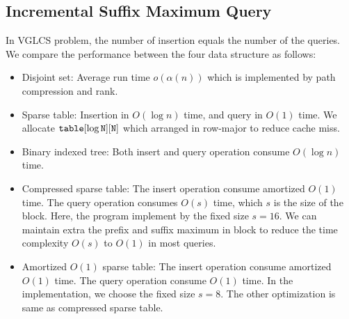 

\subsection{Incremental Suffix Maximum Query}

In VGLCS problem, the number of insertion equals the number of the
queries. We compare the performance between the four data structure as
follows:

\iffalse
針對插入和詢問次數相同的 ISMQ 問題，運行以下四種數據結構：
\fi

\begin{itemize}
  \item 

Disjoint set: Average run time $o(\alpha(n))$ which is implemented by
path compression and rank.

  \item 

Sparse table: Insertion in $O(\log n)$ time, and query in $O(1)$ time.
We allocate $\tt{table}[\log N][N]$ which arranged in row-major to
reduce cache miss.

  \item 

Binary indexed tree: Both insert and query operation consume $O(\log
n)$ time.

  \item 

Compressed sparse table: The insert operation consume amortized
$O(1)$ time.  The query operation consumes $O(s)$ time, which $s$ is the
size of the block.  Here, the program implement by the fixed size $s =
16$.  We can maintain extra the prefix and suffix maximum in block to
reduce the time complexity $O(s)$ to $O(1)$ in most queries.

  \item

Amortized $O(1)$ sparse table:  The insert operation consume amortized
$O(1)$ time.  The query operation consume $O(1)$ time.  In the
implementation, we choose the fixed size $s = 8$.  The other
optimization is same as compressed sparse table.

\end{itemize}

\iffalse
\begin{itemize}
  \item 并查集 (Disjoint Set): 平均運行時間 $o(\alpha(n))$。只使用路徑壓縮技巧。
  \item 稀疏表 (Sparse Table): 插入 $O(\log n)$、詢問 $O(1)$。實作陣列宣告採用 $\tt{table}[\log N][N]$ 以減少快取未中。
  \item 樹狀數組 (Binary Indexed Tree): 插入、詢問均為 $O(\log n)$。
  \item 壓縮稀疏表 (Compressed Sparse Tree): 插入均攤 $O(1)$、詢問操作 $O(s)$，
  其中 $s$ 為拆分到區塊大小。實作時，維護區塊前綴和後綴最大值降低詢問複雜度至 $O(1)$，當發生 in-block 詢問再運行 $O(s)$ 算法。
\end{itemize}
\fi

